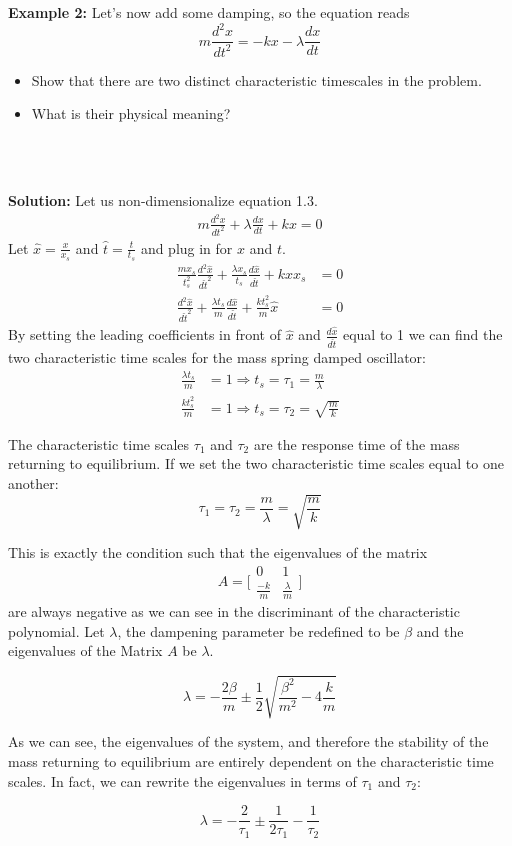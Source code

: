 \\
\\
{\bf Example 2:}
Let's now add some damping, so the equation reads
\begin{equation}
    m\frac{d^2 x}{dt^2} = - k x - \lambda \frac{dx}{dt}
    \label{eq:damp_osc}
\end{equation}
\begin{itemize}
    \item Show that there are  two distinct characteristic timescales in the problem. 
    \item What is their physical meaning?
    \end{itemize}
\\
\\
{\color{red} {\bf Solution:}
Let us non-dimensionalize equation 1.3.
\begin{align*}
  m\frac{d^2x}{dt^2} + \lambda\frac{dx}{dt} + kx = 0
\end{align*}
Let $\hat{x} = \frac{x}{x_s}$ and $\hat{t} = \frac{t}{t_s}$ and plug in for $x$ and $t$.
\begin{align*}
  \frac{mx_s}{t_s^2}\frac{d^2\hat{x}}{d\hat{t}^2} + \frac{\lambda x_s}{t_s}\frac{d\hat{x}}{d\hat{t}} + k\hat{x}x_s &= 0 \\
  \frac{d^2\hat{x}}{d\hat{t}^2} + \frac{\lambda t_s}{m}\frac{d\hat{x}}{d\hat{t}} + \frac{kt_s^2}{m}\hat{x} &= 0
\end{align*}
By setting the leading coefficients in front of $\hat{x}$ and $\frac{d\hat{x}}{d\hat{t}}$ equal to 1 we can find the two characteristic time scales for the mass spring damped oscillator:
\begin{align*}
  \frac{\lambda t_s}{m} &= 1 \Longrightarrow 
  t_s = \tau_1 = \frac{m}{\lambda} \\
  \frac{k t_s^2}{m} &= 1 \Longrightarrow
  t_s = \tau_2 = \sqrt{\frac{m}{k}}
\end{align*}

The characteristic time scales $\tau_1$ and $\tau_2$ are the response time of the mass returning to equilibrium. If we set the two characteristic time scales equal to one another:
$$\tau_1 = \tau_2 = \frac{m}{\lambda} = \sqrt{\frac{m}{k}}$$

This is exactly the condition such that the eigenvalues of the matrix $$A = \bigg[\begin{matrix}
    0 & 1 \\
    \frac{-k}{m} & \frac{\lambda}{m}
\end{matrix}\bigg]$$ are always negative as we can see in the discriminant of the characteristic polynomial. Let $\lambda$, the dampening parameter be redefined to be $\beta$ and the eigenvalues of the Matrix $A$ be $\lambda$.

$$\lambda = -\frac{2\beta}{m} \pm \frac{1}{2} \sqrt{\frac{\beta^2}{m^2} - 4 \frac{k}{m}}$$

As we can see, the eigenvalues of the system, and therefore the stability of the mass returning to equilibrium are entirely dependent on the characteristic time scales. In fact, we can rewrite the eigenvalues in terms of $\tau_1$ and $\tau_2$:

$$\lambda = -\frac{2}{\tau_1} \pm \frac{1}{2\tau_1} - \frac{1}{\tau_2}$$
}
